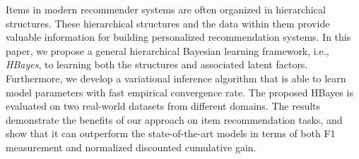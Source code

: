 Items in modern recommender systems are often organized in hierarchical structures. These hierarchical structures and the data within them provide valuable information for building personalized recommendation systems. In this paper, we propose a general hierarchical Bayesian learning framework, i.e., \emph{HBayes}, to learning both the structures and associated latent factors. Furthermore, we develop a variational inference algorithm that is able to learn model parameters with fast empirical convergence rate. The proposed HBayes is evaluated on two real-world datasets from different domains. The results demonstrate the benefits of our approach on item recommendation tasks, and show that it can outperform the state-of-the-art models in terms of both F1 measurement and normalized discounted cumulative gain.
